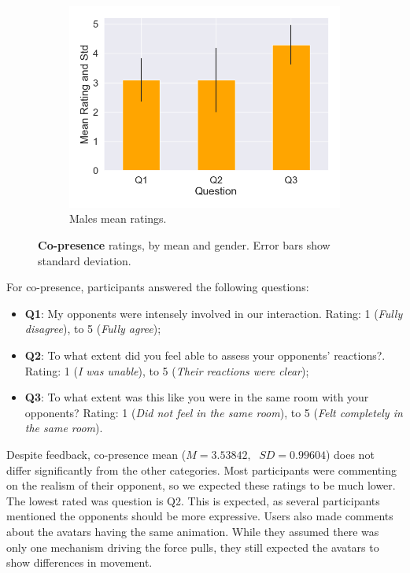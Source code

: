 \begin{figure}[H]
  \hspace{-15mm}
 \begin{subfigure}[b]{\textwidth}
 \centering
 \includegraphics[scale=0.5]{Files/Plots/copresence_mean_m.png}
 \caption{Males mean ratings.}
 \label{fig:copresMale}
 \end{subfigure}
 \hspace{20mm}
 \caption{\textbf{Co-presence} ratings, by mean and gender. Error bars show standard deviation.}
\label{fig:coAll}
\end{figure}
For co-presence, participants answered the following questions:
\begin{itemize}
\itemsep0em
    \item \textbf{Q1}: My opponents were intensely involved in our interaction. Rating: 1 (\textit{Fully disagree}), to 5 (\textit{Fully agree});
    \item \textbf{Q2}: To what extent did you feel able to assess your opponents’ reactions?. Rating: 1 (\textit{I was unable}), to 5 (\textit{Their reactions were clear});
    \item \textbf{Q3}: To what extent was this like you were in the same room with your opponents? Rating: 1 (\textit{Did not feel in the same room}), to 5 (\textit{Felt completely in the same room}).
\end{itemize}
\pagebreak
Despite feedback, co-presence mean ($M=3.53842,\;$ $ SD=0.99604 $) does not differ significantly from the other categories. Most participants were commenting on the realism of their opponent, so we expected these ratings to be much lower. The lowest rated was question is Q2. This is expected, as several participants mentioned the opponents should be more expressive. Users also made comments about the avatars having the same animation. While they assumed there was only one mechanism driving the force pulls, they still expected the avatars to show differences in movement.


